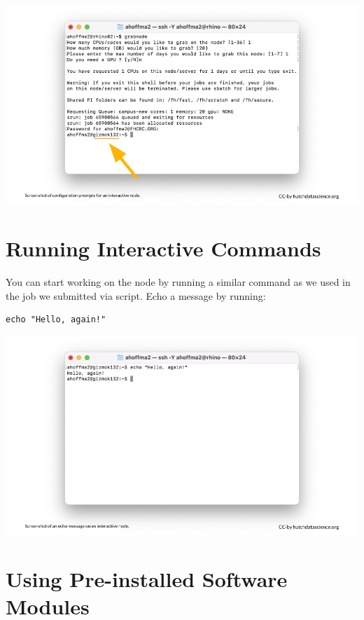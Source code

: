 \documentclass[
]{book}
\begin{document}
\includegraphics[width=1\linewidth]{resources/images/09-interactive_files/figure-latex//1BQxrVYdKZTbpCaF-i_q9w7s9x034lEXpQZDU-Sl09cs_gff2211b72f_1_50}

\hypertarget{running-interactive-commands}{%
\section{Running Interactive Commands}\label{running-interactive-commands}}

You can start working on the node by running a similar command as we used in the job we submitted via script. Echo a message by running:

\begin{verbatim}
echo "Hello, again!"
\end{verbatim}

\includegraphics[width=1\linewidth]{resources/images/09-interactive_files/figure-latex//1BQxrVYdKZTbpCaF-i_q9w7s9x034lEXpQZDU-Sl09cs_gff2211b72f_1_58}

\hypertarget{using-pre-installed-software-modules}{%
\section{Using Pre-installed Software Modules}\label{using-pre-installed-software-modules}}
\end{document}
